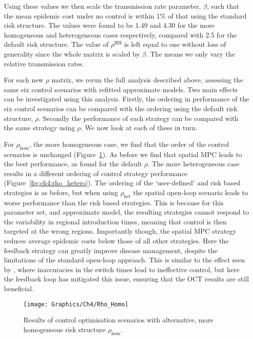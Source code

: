 Using these values we then scale the transmission rate parameter, $\beta$, such that the mean epidemic cost under no control is within 1\% of that using the standard risk structure. The values were found to be 1.49 and 4.30 for the more homogeneous and heterogeneous cases respectively, compared with 2.5 for the default risk structure. The value of $\rho^{\mathrm{HH}}$ is left equal to one without loss of generality since the whole matrix is scaled by $\beta$. The means we only vary the relative transmission rates.

For each new $\rho$ matrix, we rerun the full analysis described above, assessing the same six control scenarios with refitted approximate models. Two main effects can be investigated using this analysis. Firstly, the ordering in performance of the six control scenarios can be compared with the ordering using the default risk structure, $\rho$. Secondly the performance of each strategy can be compared with the same strategy using $\rho$. We now look at each of these in turn.

For $\rho_{\mathrm{hom}}$, the more homogeneous case, we find that the order of the control scenarios is unchanged (Figure~\ref{fig:ch4:rho_homo}). As before we find that spatial MPC leads to the best performance, as found for the default $\rho$. The more heterogeneous case results in a different ordering of control strategy performance (Figure~\ref{fig:ch4:rho_hetero}). The ordering of the `user-defined' and risk based strategies is as before, but when using $\rho_{\mathrm{het}}$ the spatial open-loop scenario leads to worse performance than the risk based strategies. This is because for this parameter set, and approximate model, the resulting strategies cannot respond to the variability in regional introduction times, meaning that control is then targeted at the wrong regions. Importantly though, the spatial MPC strategy reduces average epidemic costs below those of all other strategies. Here the feedback strategy can greatly improve disease management, despite the limitations of the standard open-loop approach. This is similar to the effect seen by \citet{forster_optimizing_2007}, where inaccuracies in the switch times lead to ineffective control, but here the feedback loop has mitigated this issue, ensuring that the OCT results are still beneficial.

\begin{figure}[h]
    \begin{center}
        \texttt{[image: Graphics/Ch4/Rho\_Homo]}
        \caption{Results of control optimisation scenarios with alternative, more homogeneous risk structure $\rho_{\mathrm{hom}}$.}
        \label{fig:ch4:rho_homo}
    \end{center}
\end{figure}

